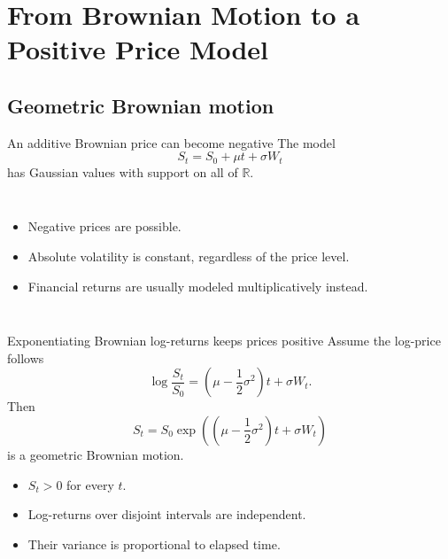 \documentclass[handout,10pt,aspectratio=169]{beamer}
\newcommand{\R}{\mathbb R}
\begin{document}
\section{From Brownian Motion to a Positive Price Model}
\subsection{Geometric Brownian motion}

\begin{frame}{An additive Brownian price can become negative}
The model
\[
S_t=S_0+\mu t+\sigma W_t
\]
has Gaussian values with support on all of \(\R\).
\begin{columns}[T,onlytextwidth]
\begin{itemize}
  \item Negative prices are possible.
  \item Absolute volatility is constant, regardless of the price level.
  \item Financial returns are usually modeled multiplicatively instead.
\end{itemize}
\centering
{}
\end{columns}
\end{frame}

\begin{frame}{Exponentiating Brownian log-returns keeps prices positive}
Assume the log-price follows
\[
\log\frac{S_t}{S_0}
=\left(\mu-\frac12\sigma^2\right)t+\sigma W_t.
\]
Then
\[
\boxed{
S_t=S_0
\exp\!\left(
\left(\mu-\frac12\sigma^2\right)t+\sigma W_t
\right)}
\]
is a geometric Brownian motion.
\begin{itemize}
  \item \(S_t>0\) for every \(t\).
  \item Log-returns over disjoint intervals are independent.
  \item Their variance is proportional to elapsed time.
\end{itemize}
\end{frame}
\end{document}
